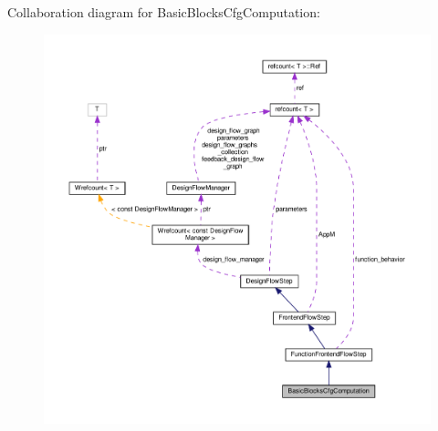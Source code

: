 Collaboration diagram for Basic\+Blocks\+Cfg\+Computation\+:
\nopagebreak
\begin{figure}[H]
\begin{center}
\leavevmode
\includegraphics[width=350pt]{d0/d54/classBasicBlocksCfgComputation__coll__graph}
\end{center}
\end{figure}
